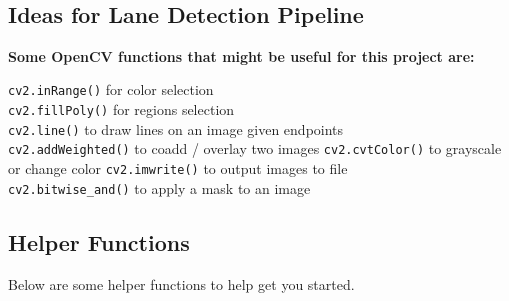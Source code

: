 \documentclass[11pt]{article}
\begin{document}
    \begin{center}
    \end{center}
    { \hspace*{\fill} \\}
    
    \hypertarget{ideas-for-lane-detection-pipeline}{%
\subsection{Ideas for Lane Detection
Pipeline}\label{ideas-for-lane-detection-pipeline}}

    \textbf{Some OpenCV functions that might be useful for this project
are:}

\texttt{cv2.inRange()} for color selection\\
\texttt{cv2.fillPoly()} for regions selection\\
\texttt{cv2.line()} to draw lines on an image given endpoints\\
\texttt{cv2.addWeighted()} to coadd / overlay two images
\texttt{cv2.cvtColor()} to grayscale or change color
\texttt{cv2.imwrite()} to output images to file\\
\texttt{cv2.bitwise\_and()} to apply a mask to an image

    \hypertarget{helper-functions}{%
\subsection{Helper Functions}\label{helper-functions}}

    Below are some helper functions to help get you started.
\end{document}

